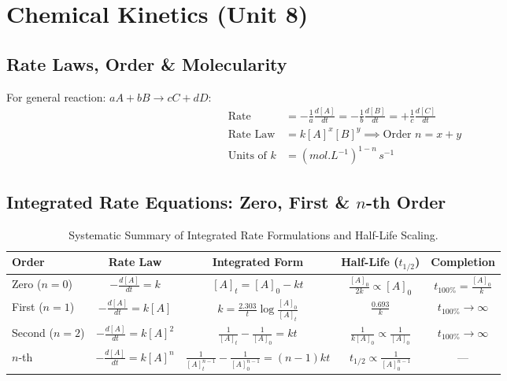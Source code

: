\documentclass[10pt,twoside,openright]{book}
\begin{document}
\newpage

\section{Chemical Kinetics (Unit 8)}

\subsection{Rate Laws, Order \& Molecularity}

\begin{formulabox}
For general reaction: $aA + bB \to cC + dD$:
\begin{align}
  \text{Rate} &= -\frac{1}{a}\frac{d[A]}{dt} = -\frac{1}{b}\frac{d[B]}{dt} = +\frac{1}{c}\frac{d[C]}{dt} \\
  \text{Rate Law} &= k[A]^x[B]^y \implies \text{Order } n = x + y \\
  \text{Units of } k &= (\si{mol.L^{-1}})^{1-n}\,\si{s^{-1}}
\end{align}
\end{formulabox}

\subsection{Integrated Rate Equations: Zero, First \& $n$-th Order}

\begin{table}[htbp]
\centering
\small
\renewcommand{\arraystretch}{1.3}
{\fontsize{7.5pt}{9.0pt}\selectfont\setlength{\tabcolsep}{1.5pt}
\begin{tabularx}{\linewidth}{l c c c c}
\toprule
\textbf{Order} & \textbf{Rate Law} & \textbf{Integrated Form} & \textbf{Half-Life ($t_{1/2}$)} & \textbf{Completion} \\
\midrule
Zero ($n=0$) & $-\frac{d[A]}{dt} = k$ & $[A]_t = [A]_0 - kt$ & $\frac{[A]_0}{2k} \propto [A]_0$ & $t_{100\%} = \frac{[A]_0}{k}$ \\
First ($n=1$) & $-\frac{d[A]}{dt} = k[A]$ & $k = \frac{2.303}{t}\log\frac{[A]_0}{[A]_t}$ & $\frac{0.693}{k}$ & $t_{100\%} \to \infty$ \\
Second ($n=2$) & $-\frac{d[A]}{dt} = k[A]^2$ & $\frac{1}{[A]_t} - \frac{1}{[A]_0} = kt$ & $\frac{1}{k[A]_0} \propto \frac{1}{[A]_0}$ & $t_{100\%} \to \infty$ \\
$n$-th & $-\frac{d[A]}{dt} = k[A]^n$ & $\frac{1}{[A]_t^{n-1}} - \frac{1}{[A]_0^{n-1}} = (n-1)kt$ & $t_{1/2} \propto \frac{1}{[A]_0^{n-1}}$ & --- \\
\bottomrule
\end{tabularx}}
\caption{Systematic Summary of Integrated Rate Formulations and Half-Life Scaling.}
\end{table}
\end{document}
